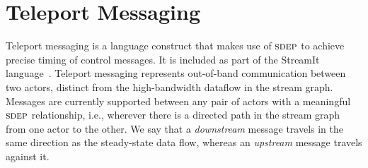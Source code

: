\section{Teleport Messaging}
\label{sec:teleport}


Teleport messaging is a language construct that makes use of $\textsc{sdep}$
to achieve precise timing of control messages.  It is included as part
of the StreamIt language~\cite{streamitcc}.  Teleport messaging
represents out-of-band communication between two actors, distinct from
the high-bandwidth dataflow in the stream graph.  Messages are
currently supported between any pair of actors with a meaningful
$\textsc{sdep}$ relationship, i.e., wherever there is a directed path in the
stream graph from one actor to the other.  We say that a {\it
downstream} message travels in the same direction as the steady-state
data flow, whereas an {\it upstream} message travels against it.

